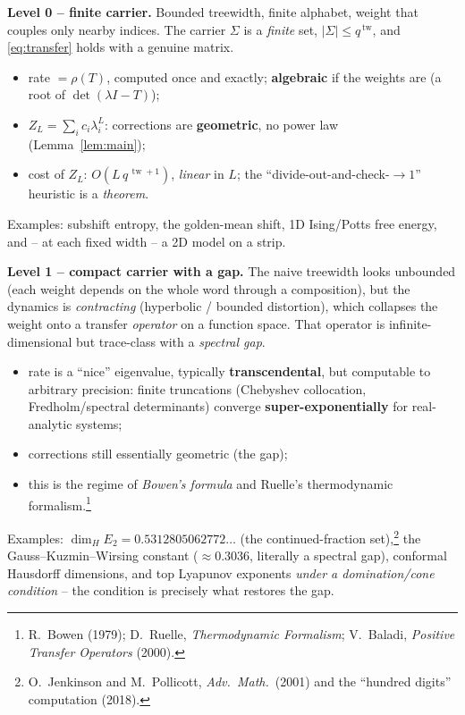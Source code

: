 \documentclass[11pt]{article}
\newcommand{\tw}{\operatorname{tw}}
\newcommand{\spec}{\rho}
\newcommand{\F}[1]{\smallskip\noindent\textbf{\textsf{#1.}}\hspace{0.4em}}
\theoremstyle{plain}
\theoremstyle{definition}
\begin{document}
\F{Level 0 -- finite carrier} Bounded treewidth, finite alphabet, weight that
couples only nearby indices. The carrier $\Sigma$ is a \emph{finite} set,
$|\Sigma|\le q^{\,\tw}$, and \eqref{eq:transfer} holds with a genuine matrix.
\begin{itemize}[itemsep=1pt]
\item rate $=\spec(T)$, computed once and exactly; \textbf{algebraic} if the
weights are (a root of $\det(\lambda I-T)$);
\item $Z_L=\sum_i c_i\lambda_i^L$: corrections are \textbf{geometric}, no power
law (Lemma~\ref{lem:main});
\item cost of $Z_L$: $O(L\,q^{\,\tw+1})$, \emph{linear} in $L$; the
``divide-out-and-check-$\to1$'' heuristic is a \emph{theorem}.
\end{itemize}
Examples: subshift entropy, the golden-mean shift, 1D Ising/Potts free energy,
and -- at each fixed width -- a 2D model on a strip.

\F{Level 1 -- compact carrier with a gap} The naive treewidth looks unbounded
(each weight depends on the whole word through a composition), but the dynamics
is \emph{contracting} (hyperbolic / bounded distortion), which collapses the
weight onto a transfer \emph{operator} on a function space. That operator is
infinite-dimensional but trace-class with a \emph{spectral gap}.
\begin{itemize}[itemsep=1pt]
\item rate is a ``nice'' eigenvalue, typically \textbf{transcendental}, but
computable to arbitrary precision: finite truncations (Chebyshev collocation,
Fredholm/spectral determinants) converge \textbf{super-exponentially} for
real-analytic systems;
\item corrections still essentially geometric (the gap);
\item this is the regime of \emph{Bowen's formula} and Ruelle's thermodynamic
formalism.\footnote{R.~Bowen (1979); D.~Ruelle, \emph{Thermodynamic Formalism};
V.~Baladi, \emph{Positive Transfer Operators} (2000).}
\end{itemize}
Examples: $\dim_H E_2=0.5312805062772\ldots$ (the continued-fraction
set),\footnote{O.~Jenkinson and M.~Pollicott, \emph{Adv.\ Math.}\ (2001) and the
``hundred digits'' computation (2018).} the Gauss--Kuzmin--Wirsing constant
($\approx0.3036$, literally a spectral gap), conformal Hausdorff dimensions, and
top Lyapunov exponents \emph{under a domination/cone condition} -- the condition
is precisely what restores the gap.
\end{document}
